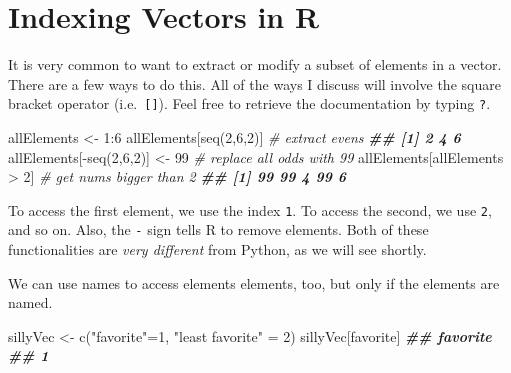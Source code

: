 \documentclass[
  12pt,
  krantz2]{krantz}
\makeatletter
\newenvironment{Shaded}{\begin{snugshade}}{\end{snugshade}}
\newcommand{\CommentTok}[1]{\textcolor[rgb]{0.37,0.37,0.37}{\textit{#1}}}
\newcommand{\DecValTok}[1]{\textcolor[rgb]{0.06,0.06,0.06}{#1}}
\newcommand{\DocumentationTok}[1]{\textcolor[rgb]{0.37,0.37,0.37}{\textbf{\textit{#1}}}}
\newcommand{\FunctionTok}[1]{\textcolor[rgb]{0,0,0}{#1}}
\newcommand{\NormalTok}[1]{#1}
\newcommand{\OtherTok}[1]{\textcolor[rgb]{0.37,0.37,0.37}{#1}}
\newcommand{\SpecialCharTok}[1]{\textcolor[rgb]{0,0,0}{#1}}
\newcommand{\StringTok}[1]{\textcolor[rgb]{0.5,0.5,0.5}{#1}}
\newenvironment{kframe}{%
\medskip{}
\setlength{\fboxsep}{.8em}
 \def\at@end@of@kframe{}%
 \ifinner\ifhmode%
  \def\at@end@of@kframe{\end{minipage}}%
  \begin{minipage}{\columnwidth}%
 \fi\fi%
 \def\FrameCommand##1{\hskip\@totalleftmargin \hskip-\fboxsep
 \colorbox{shadecolor}{##1}\hskip-\fboxsep
     \hskip-\linewidth \hskip-\@totalleftmargin \hskip\columnwidth}%
 \MakeFramed {\advance\hsize-\width
   \@totalleftmargin\z@ \linewidth\hsize
   \@setminipage}}%
 {\par\unskip\endMakeFramed%
 \at@end@of@kframe}
\renewenvironment{Shaded}{\begin{kframe}}{\end{kframe}}
\makeatother
\begin{document}
\hypertarget{indexing-vectors-in-r}{%
\section{Indexing Vectors in R}\label{indexing-vectors-in-r}}

It is very common to want to extract or modify a subset of elements in a vector. There are a few ways to do this. All of the ways I discuss will involve the square bracket operator (i.e.~\texttt{{[}{]}}). Feel free to retrieve the documentation by typing \texttt{?\textquotesingle{}{[}\textquotesingle{}}.

\begin{Shaded}
\begin{Highlighting}[]
\NormalTok{allElements }\OtherTok{\textless{}{-}} \DecValTok{1}\SpecialCharTok{:}\DecValTok{6}
\NormalTok{allElements[}\FunctionTok{seq}\NormalTok{(}\DecValTok{2}\NormalTok{,}\DecValTok{6}\NormalTok{,}\DecValTok{2}\NormalTok{)] }\CommentTok{\# extract evens}
\DocumentationTok{\#\# [1] 2 4 6}
\NormalTok{allElements[}\SpecialCharTok{{-}}\FunctionTok{seq}\NormalTok{(}\DecValTok{2}\NormalTok{,}\DecValTok{6}\NormalTok{,}\DecValTok{2}\NormalTok{)] }\OtherTok{\textless{}{-}} \DecValTok{99} \CommentTok{\# replace all odds with 99}
\NormalTok{allElements[allElements }\SpecialCharTok{\textgreater{}} \DecValTok{2}\NormalTok{] }\CommentTok{\# get nums bigger than 2}
\DocumentationTok{\#\# [1] 99 99  4 99  6}
\end{Highlighting}
\end{Shaded}

To access the first element, we use the index \texttt{1}. To access the second, we use \texttt{2}, and so on. Also, the \texttt{-} sign tells R to remove elements. Both of these functionalities are \emph{very different} from Python, as we will see shortly.

We can use names to access elements elements, too, but only if the elements are named.

\begin{Shaded}
\begin{Highlighting}[]
\NormalTok{sillyVec }\OtherTok{\textless{}{-}} \FunctionTok{c}\NormalTok{(}\StringTok{"favorite"}\OtherTok{=}\DecValTok{1}\NormalTok{, }\StringTok{"least favorite"} \OtherTok{=} \DecValTok{2}\NormalTok{)}
\NormalTok{sillyVec[}\StringTok{\textquotesingle{}favorite\textquotesingle{}}\NormalTok{]}
\DocumentationTok{\#\# favorite }
\DocumentationTok{\#\#        1}
\end{Highlighting}
\end{Shaded}
\end{document}

